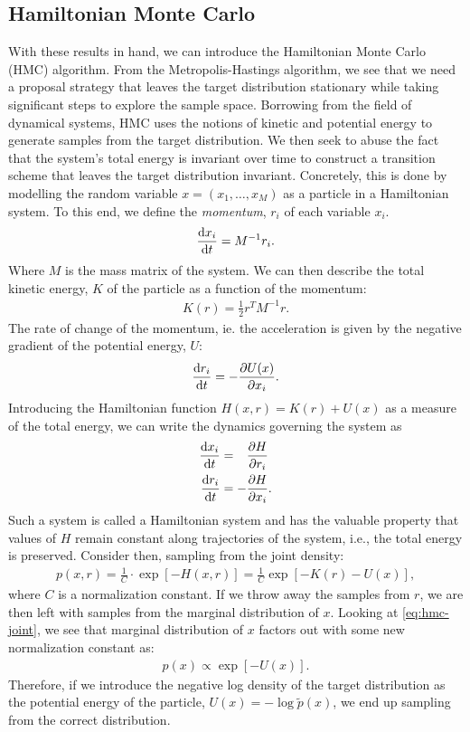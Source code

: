 \subsection{Hamiltonian Monte Carlo}

With these results in hand, we can introduce the Hamiltonian Monte Carlo (HMC) algorithm.
From the Metropolis-Hastings algorithm, we see that we need a proposal strategy that leaves the target distribution stationary while taking significant steps to explore the sample space.
Borrowing from the field of dynamical systems, HMC uses the notions of kinetic and potential energy to generate samples from the target distribution. 
We then seek to abuse the fact that the system's total energy is invariant over time to construct a transition scheme that leaves the target distribution invariant.
Concretely, this is done by modelling the random variable $x=(x_1,\dots,x_M)$ as a particle in a Hamiltonian system.
To this end, we define the \emph{momentum}, $r_i$ of each variable $x_i$.
\begin{align}
    \dv{x_i}{t} = M^{-1} r_i.
\end{align}
Where $M$ is the mass matrix of the system.
We can then describe the total kinetic energy, $K$ of the particle as a function of the momentum:
\begin{align}
    K(r) = \frac{1}{2}r^T M^{-1} r.
\end{align}
The rate of change of the momentum, ie. the acceleration is given by the negative gradient of the potential energy, $U$:
\begin{align}
    \dv{r_i}{t} = -\pdv{U(x)}{x_i}.
\end{align}
Introducing the Hamiltonian function $H(x, r) = K(r) + U(x)$ as a measure of the total energy, we can write the dynamics governing the system as
\begin{equation}\label{eq:hmc-dynamics}
    \begin{aligned}
        \dv{x_i}{t} &= \phantom{-}\pdv{H}{r_i}\\
        \dv{r_i}{t} &= -\pdv{H}{x_i}.
    \end{aligned}
\end{equation}
Such a system is called a Hamiltonian system and has the valuable property that values of $H$ remain constant along trajectories of the system, i.e., the total energy is preserved.
Consider then, sampling from the joint density:
\begin{align} \label{eq:hmc-joint}
    p(x, r) =\frac{1}{C}\cdot  \exp\left[ -H(x, r)\right] = \frac{1}{C}\exp\left[-K(r) - U(x)  \right],
\end{align}
where $C$ is a normalization constant.
If we throw away the samples from $r$, we are then left with samples from the marginal distribution of $x$.
Looking at \cref{eq:hmc-joint}, we see that marginal distribution of $x$ factors out with some new normalization constant as:
\begin{align}
    p(x) \propto \exp[-U(x)].
\end{align}
Therefore, if we introduce the negative log density of the target distribution as the potential energy of the particle, $U(x) = -\log{\tilde{p}(x)}$, we end up sampling from the correct distribution.

